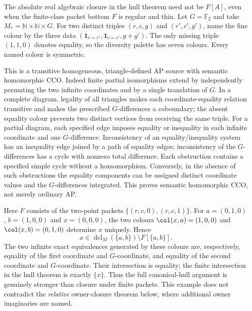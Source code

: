 \begin{example}\label{ex:two-coordinate}
The absolute real algebraic closure in the hull theorem need not be
$F[A]$, even when the finite-class packet bottom $F$ is regular and
thin.  Let $G=\mathbb F_2$ and take
$M_*=\mathbb N\times\mathbb N\times G$.  For two distinct triples
$(r,c,g)$ and $(r',c',g')$, name the fine colour by the three data
$(\mathbf 1_{r=r'},\mathbf 1_{c=c'},g+g')$.  The only missing triple
$(1,1,0)$ denotes equality, so the diversity palette has seven
colours.  Every named colour is symmetric.

This is a transitive homogeneous, triangle-defined AP source with
semantic homomorphic CCO.  Indeed finite partial isomorphisms extend
by independently permuting the two infinite coordinates and by a
single translation of $G$.  In a complete diagram, legality of all
triangles makes each coordinate-equality relation transitive and makes
the prescribed $G$-differences a coboundary; the absent equality colour
prevents two distinct vertices from receiving the same triple.  For a
partial diagram, each specified edge imposes equality or inequality in
each infinite coordinate and one $G$-difference.  Inconsistency of
an equality/inequality system has an inequality edge joined by a path
of equality edges; inconsistency of the $G$-differences has a cycle
with nonzero total difference.  Each obstruction contains a specified
simple cycle without a homomorphism.  Conversely, in the absence of
such obstructions the equality components can be assigned distinct
coordinate values and the $G$-differences integrated.  This proves
semantic homomorphic CCO, not merely ordinary AP.

Here $F$ consists of the two-point packets
$\{(r,c,0),(r,c,1)\}$.  For
$a=(0,1,0)$, $b=(1,0,0)$ and $x=(0,0,0)$, the two colours
$\col(x,a)=(1,0,0)$ and $\col(x,b)=(0,1,0)$ determine $x$
uniquely.  Hence
\[
 x\in\operatorname{dcl}_M(\{a,b\})\setminus F[\{a,b\}].
\]
The two infinite exact equivalences generated by these colours are,
respectively, equality of the first coordinate and $G$-coordinate,
and equality of the second coordinate and $G$-coordinate.  Their
intersection is equality; the finite intersection in the hull theorem
is exactly $\{x\}$.  Thus the full canonical-hull argument is genuinely
stronger than closure under finite packets.  This example does not
contradict the \emph{relative} owner-closure theorem below, where
additional owner imaginaries are named.
\end{example}


